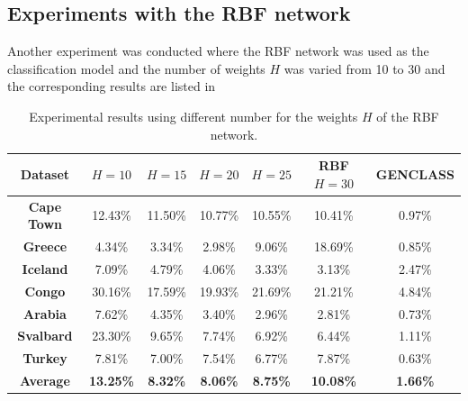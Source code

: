 \documentclass[12pt]{Definitions/academia}
\begin{document}
\clearpage
\subsection{\textmd{Experiments with the RBF network}}

Another experiment was conducted where the RBF network was used as
the classification model and the number of weights $H$ was varied
from 10 to 30 and the corresponding results are listed in 

\begin{table}[H]
	\centering
\begin{tabular}{|c|c|c|c|c|c|c|}
\hline
\textbf{Dataset} &
\centering
$H=10$
 &
\centering
$H=15$
 &
\centering
$H=20$
 &
\centering
$H=25$
 &
\centering
RBF
$H=30$
 & GENCLASS\tabularnewline
\hline
\hline
\textbf{Cape Town} & 12.43\% & 11.50\% & 10.77\% & 10.55\% & 10.41\% & 0.97\%\tabularnewline
\hline
\textbf{Greece} & 4.34\% & 3.34\% & 2.98\% & 9.06\% & 18.69\% & 0.85\%\tabularnewline
\hline
\textbf{Iceland} & 7.09\% & 4.79\% & 4.06\% & 3.33\% & 3.13\% & 2.47\%\tabularnewline
\hline
\textbf{Congo} & 30.16\% & 17.59\% & 19.93\% & 21.69\% & 21.21\% & 4.84\%\tabularnewline
\hline
\textbf{Arabia} & 7.62\% & 4.35\% & 3.40\% & 2.96\% & 2.81\% & 0.73\%\tabularnewline
\hline
\textbf{Svalbard} & 23.30\% & 9.65\% & 7.74\% & 6.92\% & 6.44\% & 1.11\%\tabularnewline
\hline
\textbf{Turkey} & 7.81\% & 7.00\% & 7.54\% & 6.77\% & 7.87\% & 0.63\%\tabularnewline
\hline
\textbf{Average} & \textbf{13.25\%} & \textbf{8.32\%} & \textbf{8.06\%} & \textbf{8.75\%} & \textbf{10.08\%} & \textbf{1.66\%}\tabularnewline
\hline
\end{tabular}
\vspace{1em}
\caption{Experimental results using different number for the weights $H$ of
the RBF network.\label{tab:Table-9-Experimental-RBF-results-using}}
\end{table}
\end{document}

